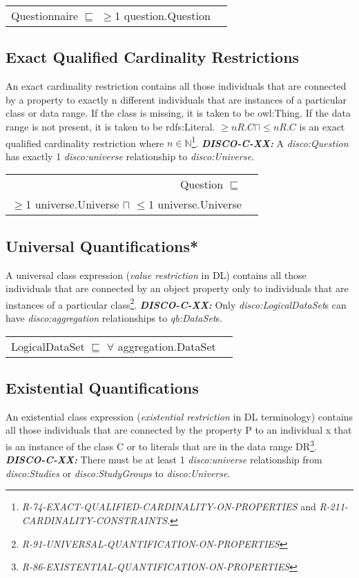 \documentclass{llncs}
\newenvironment{DL}{
  \vspace{0cm}
  \begin{tabular}{r l}

}{
  \end{tabular}
}
\begin{document}
\begin{DL}
Questionnaire $\sqsubseteq$ $\geq$1 question.Question
\end{DL}

\subsection{Exact Qualified Cardinality Restrictions}

An exact cardinality restriction contains all those individuals that are connected by a property to exactly n different individuals that are instances of a particular class or data range. 
If the class is missing, it is taken to be owl:Thing. 
If the data range is not present, it is taken to be rdfs:Literal.
$\geq n R. C \sqcap \leq n R. C $ is an exact qualified cardinality restriction where $n \in \mathbb{N}$\footnote{{\em R-74-EXACT-QUALIFIED-CARDINALITY-ON-PROPERTIES} and {\em R-211-CARDINALITY-CONSTRAINTS}.}.
\textbf{{\em DISCO-C-XX:}}
A {\em disco:Question} has exactly 1 {\em disco:universe} relationship to {\em disco:Universe}.

\begin{DL}
Question $\sqsubseteq$ \\
$\geq$1 universe.Universe $\sqcap$ $\leq$1 universe.Universe \\
\end{DL}

\subsection{Universal Quantifications*}

A universal class expression ({\em value restriction} in DL) contains all those individuals that are connected by an object property only to individuals that are instances of a particular class\footnote{{\em R-91-UNIVERSAL-QUANTIFICATION-ON-PROPERTIES}}.
\textbf{{\em DISCO-C-XX:}}
Only {\em disco:LogicalDataSet}s can have {\em disco:aggregation} relationships to {\em qb:DataSet}s.

\begin{DL}
LogicalDataSet $\sqsubseteq$ $\forall$ aggregation.DataSet \\
\end{DL}

\subsection{Existential Quantifications}

An existential class expression ({\em existential restriction} in DL terminology) contains all those individuals that are connected by the property P to an individual x that is an instance of the class C or to literals that are in the data range DR\footnote{{\em R-86-EXISTENTIAL-QUANTIFICATION-ON-PROPERTIES}}.
\textbf{{\em DISCO-C-XX:}} 
There must be at least 1 {\em disco:universe} relationship from {\em disco:Studies} or {\em disco:StudyGroups} to {\em disco:Universe}.
\end{document}
